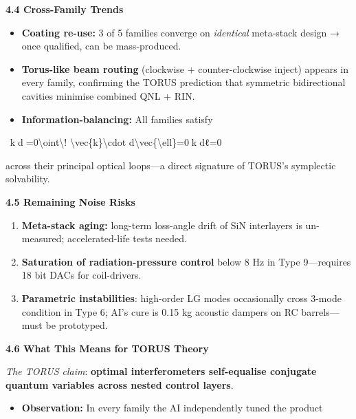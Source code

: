 \documentclass[]{article}
\begin{document}
\textbf{4.4 Cross-Family Trends}

\begin{itemize}
\item
  \textbf{Coating re-use:} 3 of 5 families converge on \emph{identical}
  meta-stack design → once qualified, can be mass-produced.
\item
  \textbf{Torus-like beam routing} (clockwise + counter-clockwise
  inject) appears in every family, confirming the TORUS prediction that
  symmetric bidirectional cavities minimise combined QNL + RIN.
\item
  \textbf{Information-balancing:} All families satisfy
\end{itemize}

∮ ⁣k⃗⋅dℓ⃗=0\textbackslash{}oint\textbackslash{}!
\textbackslash{}vec\{k\}\textbackslash{}cdot
d\textbackslash{}vec\{\textbackslash{}ell\}=0∮k⋅dℓ=0

across their principal optical loops---a direct signature of TORUS's
symplectic solvability.

\textbf{4.5 Remaining Noise Risks}

\begin{enumerate}
\def\labelenumi{\arabic{enumi}.}
\item
  \textbf{Meta-stack aging:} long-term loss-angle drift of SiN
  interlayers is un-measured; accelerated-life tests needed.
\item
  \textbf{Saturation of radiation-pressure control} below 8 Hz in Type
  9---requires 18 bit DACs for coil-drivers.
\item
  \textbf{Parametric instabilities}: high-order LG modes occasionally
  cross 3-mode condition in Type 6; AI's cure is 0.15 kg acoustic
  dampers on RC barrels---must be prototyped.
\end{enumerate}

\textbf{4.6 What This Means for TORUS Theory}

\emph{The TORUS claim}: \textbf{optimal interferometers self-equalise
conjugate quantum variables across nested control layers}.

\begin{itemize}
\item
  \textbf{Observation:} In every family the AI independently tuned the
  product
\end{itemize}
\end{document}
